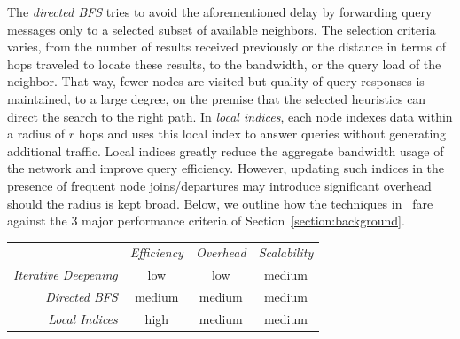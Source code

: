 The \emph{directed BFS}
tries to avoid the aforementioned delay by forwarding 
query messages only to a selected subset of available neighbors. The selection
criteria varies, from the number of results received previously or the distance
in terms of hops traveled to locate these results, to the bandwidth, or the
query load of the neighbor. That way, fewer nodes are visited but quality of
query responses is maintained, to a large degree, on the premise that the
selected heuristics can direct the search to the right path.
%
In \emph{local indices},
each node indexes data within a radius of $r$ hops and uses 
this local index to answer queries %
without generating additional traffic. Local indices
greatly reduce the aggregate bandwidth usage of the network and 
improve query efficiency. However, updating such indices in 
the presence of frequent node joins/departures 
may introduce significant overhead should the radius is kept broad.
Below, we outline how the techniques in~\cite{YG-M2002}
fare against the $3$ major performance criteria 
of Section~\ref{section:background}.
\begin{center}
{\footnotesize
\begin{tabular}{rccc}
\multicolumn{1}{r}{} &
\multicolumn{1}{c}{\emph{Efficiency}} &
\multicolumn{1}{c}{\emph{Overhead}} &
\multicolumn{1}{c}{\emph{Scalability}}
\\
\cline{2-4}
\emph{Iterative Deepening} &
low &
low &
% 
medium \\
\emph{Directed BFS} &
medium &
medium &
medium \\
\emph{Local Indices} &
high &
medium &
medium \\
\end{tabular}
}
\end{center}

